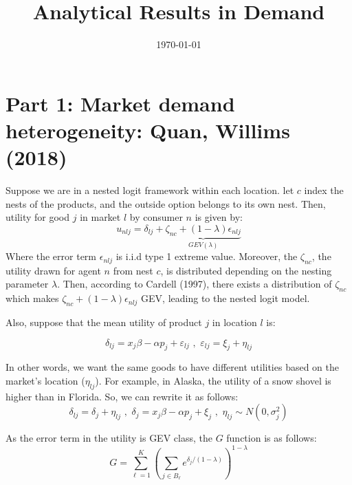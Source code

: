 \documentclass[12pt]{article}
\begin{document}
\title{Analytical Results in Demand}

\date{\today}
\maketitle
\section*{Part 1: Market demand
heterogeneity: Quan, Willims (2018)}

Suppose we are in a nested logit framework within each location. let $c$ index the nests of the products, and the outside option belongs to its own nest. Then, utility for good $j$ in market $l$ by consumer
$n$ is given by:
\begin{equation}
  \boxed{u_{nlj} = \delta_{lj} + \underbrace{\zeta_{nc} + 
  (1-\lambda)\epsilon_{nlj}}_{GEV(\lambda)
}}
\end{equation}
Where the error term $\epsilon_{nlj}$ is i.i.d type 1 extreme value. Moreover, the $\zeta_{nc}$, the utility drawn for agent $n$ from nest $c$, is distributed depending on the nesting parameter $\lambda$. Then, according to Cardell (1997), there exists a distribution of $\zeta_{nc}$ which makes $\zeta_{nc} + 
  (1-\lambda)\epsilon_{nlj}$ GEV, leading to the nested logit model.

Also, suppose that the mean utility of product $j$ in location $l$ is:

\begin{equation}
    \delta_{lj} = x_j \beta - \alpha p_j + \varepsilon_{lj} \,\, ,\,\,
    \varepsilon_{lj}=\xi_{j} + \eta_{lj}
\end{equation}

In other words, we want the same goods to have different utilities based on the market's location ($\eta_{lj}$). For example, in Alaska, the utility of a snow shovel is higher than in Florida. So, we can rewrite it as follows:
\begin{equation}
    \boxed{
    \delta_{lj} = \delta_{j} + \eta_{lj} \,\, ,\,\, \delta_{j} = x_j\beta - \alpha p_j + \xi_{j}
     \,\, ,\,\, \eta_{lj}\sim N\left(0,\sigma^2_j\right)}
\end{equation}

As the error term in the utility is GEV class, the $G$ function is as follows:
\begin{equation*}
    G = \sum_{\ell=1}^K\left(\sum_{j\in B_\ell}e^{\delta_j/(1-\lambda)}\right)^{1-\lambda}
\end{equation*}
\end{document}
